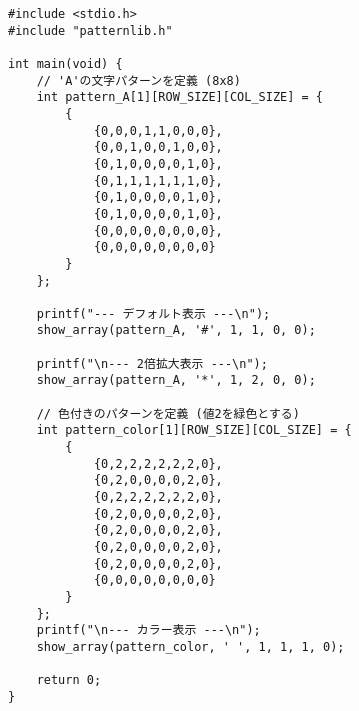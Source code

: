 \documentclass[uplatex]{jsarticle}
\begin{document}
\begin{verbatim}
#include <stdio.h>
#include "patternlib.h"

int main(void) {
    // 'A'の文字パターンを定義 (8x8)
    int pattern_A[1][ROW_SIZE][COL_SIZE] = {
        {
            {0,0,0,1,1,0,0,0},
            {0,0,1,0,0,1,0,0},
            {0,1,0,0,0,0,1,0},
            {0,1,1,1,1,1,1,0},
            {0,1,0,0,0,0,1,0},
            {0,1,0,0,0,0,1,0},
            {0,0,0,0,0,0,0,0},
            {0,0,0,0,0,0,0,0}
        }
    };

    printf("--- デフォルト表示 ---\n");
    show_array(pattern_A, '#', 1, 1, 0, 0);

    printf("\n--- 2倍拡大表示 ---\n");
    show_array(pattern_A, '*', 1, 2, 0, 0);

    // 色付きのパターンを定義 (値2を緑色とする)
    int pattern_color[1][ROW_SIZE][COL_SIZE] = {
        {
            {0,2,2,2,2,2,2,0},
            {0,2,0,0,0,0,2,0},
            {0,2,2,2,2,2,2,0},
            {0,2,0,0,0,0,2,0},
            {0,2,0,0,0,0,2,0},
            {0,2,0,0,0,0,2,0},
            {0,2,0,0,0,0,2,0},
            {0,0,0,0,0,0,0,0}
        }
    };
    printf("\n--- カラー表示 ---\n");
    show_array(pattern_color, ' ', 1, 1, 1, 0);

    return 0;
}
\end{verbatim}
\end{document}
